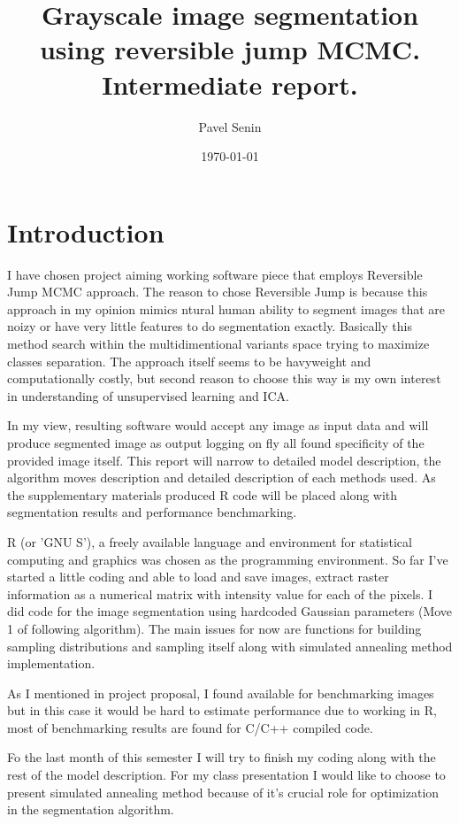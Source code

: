 \documentclass{article}
\title{Grayscale image segmentation using reversible jump MCMC. Intermediate report.}
\author{Pavel Senin}
\date{\today}
\begin{document}
\maketitle
\clearpage
\tableofcontents
\clearpage

\section{Introduction}

I have chosen project aiming working software piece that employs Reversible Jump MCMC approach. The reason to chose Reversible Jump is because this approach in my opinion mimics ntural human ability to segment images that are noizy or have very little features to do segmentation exactly. Basically this method search within the multidimentional variants space trying to maximize classes separation. The approach itself seems to be havyweight and computationally costly, but second reason to choose this way is my own interest in understanding of unsupervised learning and ICA. 

In my view, resulting software would accept any image as input data and will produce segmented image as output logging on fly all found specificity of the provided image itself. This report will narrow to detailed model description, the algorithm moves description and detailed description of each methods used. As the supplementary materials produced R code will be placed along with segmentation results and performance benchmarking.

R (or 'GNU S'), a freely available language and environment for statistical computing and graphics was chosen as the programming environment. So far I've started a little coding and able to load and save images, extract raster information as a numerical matrix with intensity value for each of the pixels. I did code for the image segmentation using hardcoded Gaussian parameters (Move 1 of following algorithm). The main issues for now are functions for building sampling distributions and sampling itself along with simulated annealing method implementation.

As I mentioned in project proposal, I found available for benchmarking images but in this case it would be hard to estimate performance due to working in R, most of benchmarking results are found for C/C++ compiled code.

Fo the last month of this semester I will try to finish my coding along with the rest of the model description. For my class presentation I would like to choose to present simulated annealing method because of it's crucial role for optimization in the segmentation algorithm.
\end{document}
